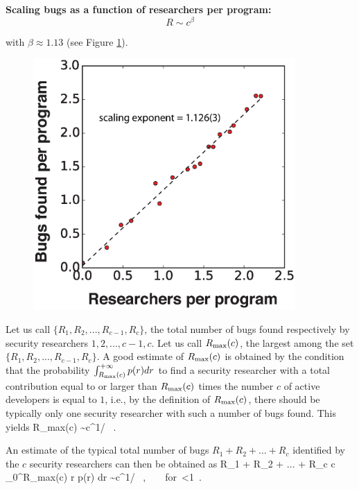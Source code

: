 {\bf Scaling bugs as a function of researchers per program:}
\begin{equation}
R \sim c^{\beta}
\end{equation}

with $\beta \approx 1.13$ (see Figure \ref{fig:scaling}).


\begin{figure}
\begin{center}
\includegraphics[width=10cm]{figures/scaling_bugs_vs_researchers.eps}
\caption{ }
\label{fig:scaling}
\end{center}
\end{figure}





Let us call $\{R_1, R_2, ..., R_{c-1}, R_c\}$, the total number of bugs found respectively by security researchers $1, 2, ..., c-1, c$. 
Let us call $R_{\rm max}(c)$, the largest among the set  $\{R_1, R_2, ..., R_{c-1}, R_c\}$. A good estimate of $R_{\rm max}(c)$ is obtained by the condition that the probability $\int_{R_{\rm max}(c)}^{+\infty}  p(r) dr$ to find a security researcher with a total contribution equal to or larger than $R_{\rm max}(c)$ times the number $c$ of active developers is equal to $1$, i.e., by the definition of $R_{\rm max}(c)$, there should be typically only one 
security researcher with such a number of bugs found. This yields
\be
 R_{\rm max}(c)  \sim c^{1/\mu} ~. 
 \label{sdfjhsg9e}
\ee



An estimate of the typical total number of bugs  $R_1 +  R_2 + ... + R_c$  identified
by the $c$ security researchers can  then be obtained as  \cite{Bougeorges,sornette2006critical}
\be
R_1 +  R_2 + ... + R_c   \approx c  \int_0^{R_{\rm max}(c)} r   p(r) dr
 \sim  c^{1/\mu}    ~,~~~~{\rm  for}~\mu <1~.
 \label{rjtik6ik}
\ee


